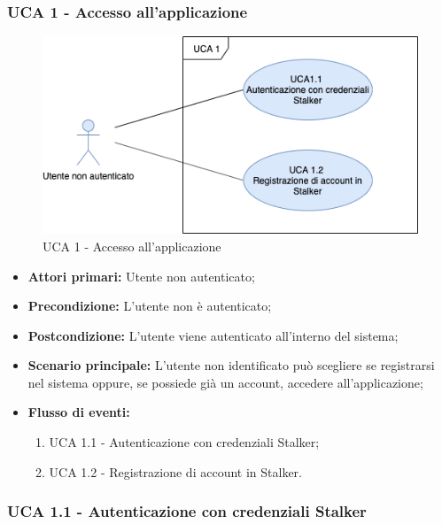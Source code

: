 \subsubsection{UCA 1 - Accesso all'applicazione}%

\begin{figure}[h]
  \centering
    \includegraphics[scale=0.8]{sezioni/UseCase/Immagini/Panoramica.png}
  \caption{UCA 1 -  Accesso all'applicazione}
\end{figure}

\begin{itemize}
\item \textbf{Attori primari:} Utente non autenticato;
\item \textbf{Precondizione:} L'utente non è autenticato;
\item \textbf{Postcondizione:} L'utente viene autenticato all'interno del sistema;
\item \textbf{Scenario principale:} L'utente non identificato può scegliere se registrarsi nel sistema oppure, se possiede già un account, accedere all'applicazione; %
\item \textbf{Flusso di eventi:}
    \begin{enumerate}
        \item UCA 1.1 - Autenticazione con credenziali Stalker;
        \item UCA 1.2 - Registrazione di account in Stalker.
    \end{enumerate}

\end{itemize}



\subsubsection{UCA 1.1 - Autenticazione con credenziali Stalker}%

